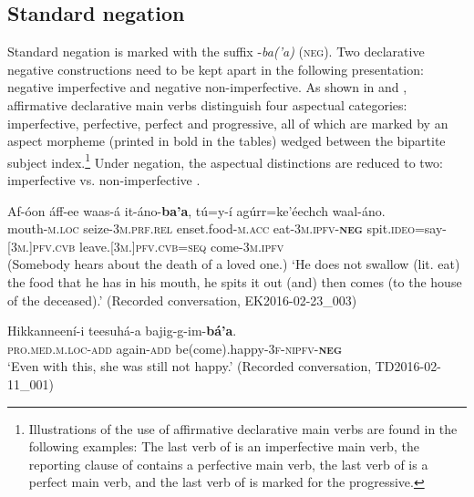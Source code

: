 \documentclass[output=paper,colorlinks,citecolor=brown,draftmode
]{langscibook}
\begin{document}
\subsection{Standard negation}\label{sec:treis:2.1}

Standard negation is marked with the suffix -\textit{ba(’a)} (\textsc{neg}). Two declarative negative constructions need to be kept apart in the following presentation: negative imperfective and negative non-imperfective. As shown in  and , affirmative declarative main verbs distinguish four aspectual categories: imperfective, perfective, perfect and progressive, all of which are marked by an aspect morpheme (printed in bold in the tables) wedged between the bipartite subject index.\footnote{Illustrations of the use of affirmative declarative main verbs are found in the following examples: The last verb of  is an imperfective main verb, the reporting clause of  contains a perfective main verb, the last verb of  is a perfect main verb, and the last verb of  is marked for the progressive.} Under negation, the aspectual distinctions are reduced to two: imperfective  vs. non-\hspace{0pt}imperfective . 


\ea\label{ex:treis:1} \gll Af-óon áff-ee waas-á it-áno-\textbf{ba’a}, tú=y-í 	agúrr=ke’éechch waal-áno.\\
mouth-\textsc{m.loc} seize-\textsc{3m.prf.rel} enset.food-\textsc{m.acc}	eat-\textsc{3m.ipfv-\textbf{neg}} spit.\textsc{ideo}=say-\textsc{[3m.]pfv.cvb}\footnotemark{}	
leave.\textsc{[3m.]pfv.cvb=seq} come-\textsc{3m.ipfv}\\
\glt (Somebody hears about the death of a loved one.) ‘He does not swallow (lit. eat) the food that he has in his mouth, he spits it out (and) then comes (to the house of the deceased).’ (Recorded conversation, EK2016-02-23\_003)
\z
{}

\ea\label{ex:treis:2} 
\gll Hikkanneení-i teesuhá-a bajig-g-im-\textbf{bá’a}.\\ 
\textsc{pro.med.m.loc-add} again-\textsc{add} be(come).happy-\textsc{3f-nipfv-\textbf{neg}}\\
\glt ‘Even with this, she was still not happy.’ (Recorded conversation, TD2016-02-11\_001)
\z 
\end{document}

